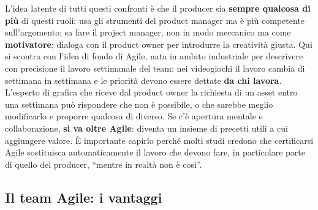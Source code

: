 L'idea latente di tutti questi confronti è che il producer sia \textbf{sempre
qualcosa di più} di questi ruoli: usa gli strumenti del product manager ma è più
competente sull'argomento; sa fare il project manager, non in modo meccanico ma
come \textbf{motivatore}; dialoga con il product owner per introdurre la
creatività giusta. Qui si scontra con l'idea di fondo di Agile, nata in ambito
industriale per descrivere con precisione il lavoro settimanale del team: nei
videogiochi il lavoro cambia di settimana in settimana e le priorità devono
essere dettate \textbf{da chi lavora}. L'esperto di grafica che riceve dal
product owner la richiesta di un asset entro una settimana può rispondere che
non è possibile, o che sarebbe meglio modificarlo e proporre qualcosa di
diverso. Se c'è apertura mentale e collaborazione, \textbf{si va oltre Agile}:
diventa un insieme di precetti utili a cui aggiungere valore. È importante
capirlo perché molti studi credono che certificarsi Agile sostituisca
automaticamente il lavoro che devono fare, in particolare parte di quello del
producer, ``mentre in realtà non è così''.

\subsection{Il team Agile: i vantaggi}

